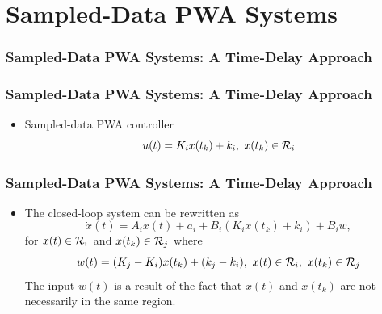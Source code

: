 \documentclass{beamer}
\newcommand{\RR}{{\cal R}}
\newcommand{\beq}{\begin{equation*}}
\newcommand{\eeq}{\end{equation*}}
\begin{document}
\section[Chapter 6]{Sampled-Data PWA Systems}

  \frame
  {
    \frametitle{Sampled-Data PWA Systems: A Time-Delay Approach}

    \centerline{}
  }

  \frame
  {
    \frametitle{Sampled-Data PWA Systems: A Time-Delay Approach}
\begin{itemize}
\item Sampled-data PWA controller
\beq
u(t)=K_ix(t_k)+k_i,\ x(t_k)\in\RR_i
\eeq
\centerline{}
\end{itemize}
  }

  \frame
  {
    \frametitle{Sampled-Data PWA Systems: A Time-Delay Approach}
\begin{itemize}
\item The closed-loop system can be rewritten as
\beq
\dot x(t)=A_ix(t)+a_i+B_i(K_ix(t_k)+k_i)+B_iw,
\eeq
for $x(t)\in\RR_i$ and $x(t_k)\in\RR_j$ where
\beq
w(t) = (K_j-K_i)x(t_k)+(k_j-k_i),\ x(t)\in\RR_i,\ x(t_k)\in\RR_j
\eeq
The input $w(t)$ is a result of the fact that $x(t)$ and $x(t_k)$ are not necessarily in the same region. 
\end{itemize}
}
\end{document}
